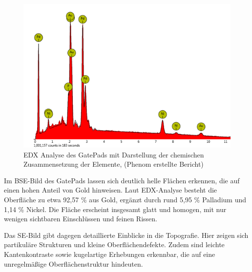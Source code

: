 \begin{figure}[H]
\begin{minipage}{.5\textwidth}
          \label{REM-Aufnahme(SE Komposit) des GatePads mit Punktanalyse}
        \end{minipage}
        
        \end{figure}
        \begin{figure}[H]
            \centering
            \includegraphics[scale=0.95]{Bilder/gatepad}
            \caption{EDX Analyse des GatePads mit Darstellung der chemischen Zusammensetzung der Elemente, (Phenom erstellte Bericht)}
            
            \vspace{0.2cm}
            \label{Abb.2: EDX Analyse des GatePads}
        \end{figure} 
        Im BSE-Bild des GatePads lassen sich deutlich helle Flächen erkennen, die auf einen hohen Anteil von Gold hinweisen. Laut EDX-Analyse besteht die Oberfläche zu etwa 92,57 \% aus Gold, ergänzt durch rund 5,95 \% Palladium und 1,14 \% Nickel. Die Fläche erscheint insgesamt glatt und homogen, mit nur wenigen sichtbaren Einschlüssen und feinen Rissen.

        Das SE-Bild gibt dagegen detaillierte Einblicke in die Topografie. Hier zeigen sich partikuläre Strukturen und kleine Oberflächendefekte. Zudem sind leichte Kantenkontraste sowie kugelartige Erhebungen erkennbar, die auf eine unregelmäßige Oberflächenstruktur hindeuten.


